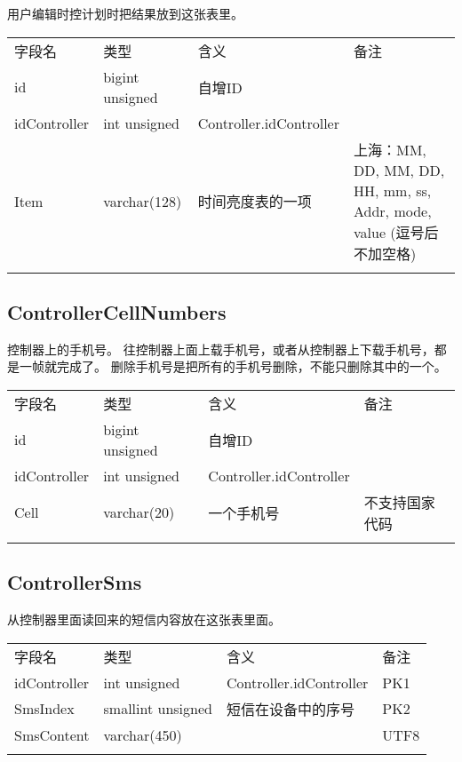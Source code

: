 用户编辑时控计划时把结果放到这张表里。

\begin{longtabu}[c]{@{}lXXX@{}}
\toprule\addlinespace
字段名 & 类型 & 含义 & 备注
\\\addlinespace
\midrule\endhead
id & bigint unsigned & 自增ID &
\\\addlinespace
idController & int unsigned & Controller.idController &
\\\addlinespace
Item & varchar(128) & 时间亮度表的一项 & 上海：MM, DD, MM, DD, HH, mm,
ss, Addr, mode, value (逗号后不加空格)
\\\addlinespace
\bottomrule
\end{longtabu}

\subsection{ControllerCellNumbers}\label{controllercellnumbers}

控制器上的手机号。
往控制器上面上载手机号，或者从控制器上下载手机号，都是一帧就完成了。
删除手机号是把所有的手机号删除，不能只删除其中的一个。

\begin{longtabu}[c]{@{}lXXX@{}}
\toprule\addlinespace
字段名 & 类型 & 含义 & 备注
\\\addlinespace
\midrule\endhead
id & bigint unsigned & 自增ID &
\\\addlinespace
idController & int unsigned & Controller.idController &
\\\addlinespace
Cell & varchar(20) & 一个手机号 & 不支持国家代码
\\\addlinespace
\bottomrule
\end{longtabu}

\subsection{ControllerSms}\label{controllersms}

从控制器里面读回来的短信内容放在这张表里面。

\begin{longtabu}[c]{@{}lXXX@{}}
\toprule\addlinespace
字段名 & 类型 & 含义 & 备注
\\\addlinespace
\midrule\endhead
idController & int unsigned & Controller.idController & PK1
\\\addlinespace
SmsIndex & smallint unsigned & 短信在设备中的序号 & PK2
\\\addlinespace
SmsContent & varchar(450) & & UTF8
\\\addlinespace
\bottomrule
\end{longtabu}

